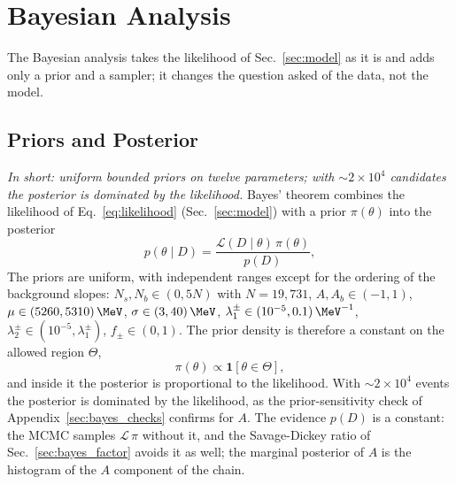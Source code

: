 \section{Bayesian Analysis}
\label{sec:bayesian}
The Bayesian analysis takes the likelihood of Sec.~\ref{sec:model} as it is and adds only a prior and a sampler; it changes the question asked of the data, not the model.

\subsection{Priors and Posterior}
\label{sec:bayes_prior}
\emph{In short: uniform bounded priors on twelve parameters; with $\sim2\times10^4$ candidates the posterior is dominated by the likelihood.}
Bayes' theorem combines the likelihood of Eq.~\eqref{eq:likelihood} (Sec.~\ref{sec:model}) with a prior $\pi(\theta)$ into the posterior
\begin{equation}
p(\theta\mid D)=\frac{\mathcal{L}(D\mid\theta)\,\pi(\theta)}{p(D)},
\label{eq:bayes}
\end{equation}
The priors are uniform, with independent ranges except for the ordering of the background slopes: $N_s,N_b\in(0,5N)$ with $N=19{,}731$, $A,A_b\in(-1,1)$, $\mu\in(5260,5310)\,\MeV$, $\sigma\in(3,40)\,\MeV$, $\lambda_1^{\pm}\in(10^{-5},0.1)\,\MeV^{-1}$, $\lambda_2^{\pm}\in(10^{-5},\lambda_1^{\pm})$, $f_{\pm}\in(0,1)$. The prior density is therefore a constant on the allowed region $\Theta$,
\begin{equation}
\pi(\theta)\propto\mathbf{1}\left[\theta\in\Theta\right],
\label{eq:prior}
\end{equation}
and inside it the posterior is proportional to the likelihood. With $\sim$$2\times10^4$ events the posterior is dominated by the likelihood, as the prior-sensitivity check of Appendix~\ref{sec:bayes_checks} confirms for $A$. The evidence $p(D)$ is a constant: the MCMC samples $\mathcal{L}\,\pi$ without it, and the Savage-Dickey ratio of Sec.~\ref{sec:bayes_factor} avoids it as well; the marginal posterior of $A$ is the histogram of the $A$ component of the chain.

